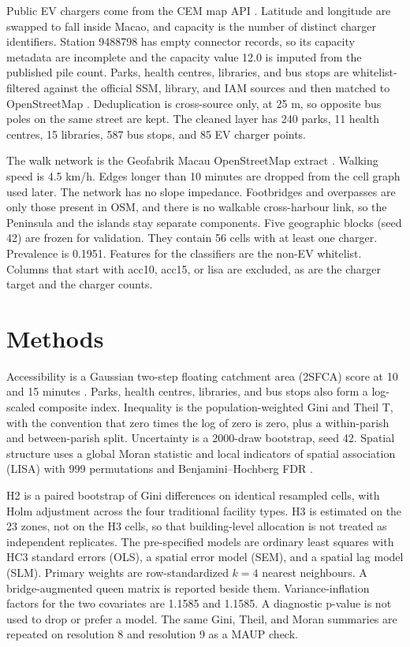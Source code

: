 \documentclass[11pt,a4paper]{article}
\begin{document}
Public EV chargers come from the CEM map API \citep{cem2026}. Latitude and longitude are swapped to fall inside Macao, and capacity is the number of distinct charger identifiers. Station 9488798 has empty connector records, so its capacity metadata are incomplete and the capacity value 12.0 is imputed from the published pile count. Parks, health centres, libraries, and bus stops are whitelist-filtered against the official SSM, library, and IAM sources and then matched to OpenStreetMap \citep{osm2026}. Deduplication is cross-source only, at 25 m, so opposite bus poles on the same street are kept. The cleaned layer has 240 parks, 11 health centres, 15 libraries, 587 bus stops, and 85 EV charger points.

The walk network is the Geofabrik Macau OpenStreetMap extract \citep{osm2026}. Walking speed is 4.5 km/h. Edges longer than 10 minutes are dropped from the cell graph used later. The network has no slope impedance. Footbridges and overpasses are only those present in OSM, and there is no walkable cross-harbour link, so the Peninsula and the islands stay separate components. Five geographic blocks (seed 42) are frozen for validation. They contain 56 cells with at least one charger. Prevalence is 0.1951. Features for the classifiers are the non-EV whitelist. Columns that start with acc10, acc15, or lisa are excluded, as are the charger target and the charger counts.

\section{Methods}
Accessibility is a Gaussian two-step floating catchment area (2SFCA) score at 10 and 15 minutes \citep{luo2003,dai2010}. Parks, health centres, libraries, and bus stops also form a log-scaled composite index. Inequality is the population-weighted Gini and Theil T, with the convention that zero times the log of zero is zero, plus a within-parish and between-parish split. Uncertainty is a 2000-draw bootstrap, seed 42. Spatial structure uses a global Moran statistic and local indicators of spatial association (LISA) with 999 permutations and Benjamini--Hochberg FDR \citep{anselin1995,bh1995}.

H2 is a paired bootstrap of Gini differences on identical resampled cells, with Holm adjustment across the four traditional facility types. H3 is estimated on the 23 zones, not on the H3 cells, so that building-level allocation is not treated as independent replicates. The pre-specified models are ordinary least squares with HC3 standard errors (OLS), a spatial error model (SEM), and a spatial lag model (SLM). Primary weights are row-standardized $k=4$ nearest neighbours. A bridge-augmented queen matrix is reported beside them. Variance-inflation factors for the two covariates are 1.1585 and 1.1585. A diagnostic p-value is not used to drop or prefer a model. The same Gini, Theil, and Moran summaries are repeated on resolution 8 and resolution 9 as a MAUP check.
\end{document}

